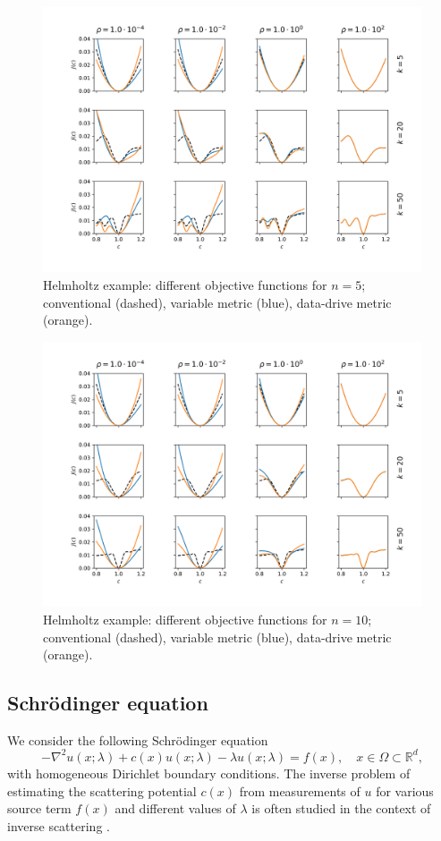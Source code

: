 \documentclass[12pt]{amsart}
\begin{document}
\begin{figure}
\includegraphics[scale=.5]{Figures/Helmholtz1D_5.png}
\caption{Helmholtz example: different objective functions for $n=5$; conventional (dashed), variable metric (blue), data-drive metric (orange).}\label{fig:helmholtz1db}
\end{figure}

\begin{figure}
\includegraphics[scale=.5]{Figures/Helmholtz1D_10.png}
\caption{Helmholtz example: different objective functions for $n=10$; conventional (dashed), variable metric (blue), data-drive metric (orange).}\label{fig:helmholtz1dc}
\end{figure}
\subsection{Schr{\"o}dinger equation}
We consider the following Schr{\"o}dinger equation
\begin{equation}\label{eq:sch_eqn}
-\nabla^2 u(x;\lambda) + c(x)u(x;\lambda) - \lambda u(x;\lambda) = f(x), \quad x \in \Omega\subset{\mathbb{R}^d},
\end{equation}
with homogeneous Dirichlet boundary conditions. The inverse problem of estimating the scattering potential $c(x)$ from measurements of $u$ for various source term $f(x)$ and different values of $\lambda$ is often studied in the context of inverse scattering \cite{imanuvilov2012inverse,Novikov2022}.
\end{document}
